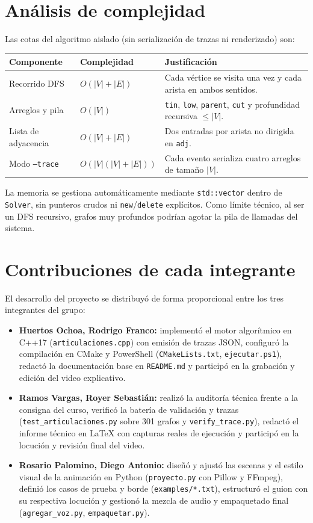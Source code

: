 \documentclass[11pt,a4paper]{article}
\begin{document}
\section{Análisis de complejidad}
Las cotas del algoritmo aislado (sin serialización de trazas ni renderizado) son:

\begin{center}
\begin{tabular}{@{}llp{8.2cm}@{}}
\toprule
Componente & Complejidad & Justificación \\
\midrule
Recorrido DFS & $O(|V| + |E|)$ & Cada vértice se visita una vez y cada arista en ambos sentidos. \\
Arreglos y pila & $O(|V|)$ & \texttt{tin}, \texttt{low}, \texttt{parent}, \texttt{cut} y profundidad recursiva $\le |V|$. \\
Lista de adyacencia & $O(|V| + |E|)$ & Dos entradas por arista no dirigida en \texttt{adj}. \\
Modo \texttt{--trace} & $O(|V|(|V| + |E|))$ & Cada evento serializa cuatro arreglos de tamaño $|V|$. \\
\bottomrule
\end{tabular}
\end{center}

La memoria se gestiona automáticamente mediante \texttt{std::vector} dentro de
\texttt{Solver}, sin punteros crudos ni \texttt{new}/\texttt{delete} explícitos.
Como límite técnico, al ser un DFS recursivo, grafos muy profundos podrían
agotar la pila de llamadas del sistema.

\section{Contribuciones de cada integrante}
El desarrollo del proyecto se distribuyó de forma proporcional entre los tres
integrantes del grupo:
\begin{itemize}
  \item \textbf{Huertos Ochoa, Rodrigo Franco:} implementó el motor algorítmico
    en C++17 (\texttt{articulaciones.cpp}) con emisión de trazas JSON, configuró
    la compilación en CMake y PowerShell (\texttt{CMakeLists.txt},
    \texttt{ejecutar.ps1}), redactó la documentación base en \texttt{README.md}
    y participó en la grabación y edición del video explicativo.
  \item \textbf{Ramos Vargas, Royer Sebastián:} realizó la auditoría técnica
    frente a la consigna del curso, verificó la batería de validación y trazas
    (\texttt{test\_articulaciones.py} sobre 301 grafos y
    \texttt{verify\_trace.py}), redactó el informe técnico en \LaTeX{} con
    capturas reales de ejecución y participó en la locución y revisión final del
    video.
  \item \textbf{Rosario Palomino, Diego Antonio:} diseñó y ajustó las escenas y
    el estilo visual de la animación en Python (\texttt{proyecto.py} con Pillow
    y FFmpeg), definió los casos de prueba y borde (\texttt{examples/*.txt}),
    estructuró el guion con su respectiva locución y gestionó la mezcla de audio
    y empaquetado final (\texttt{agregar\_voz.py}, \texttt{empaquetar.py}).
\end{itemize}
\end{document}
